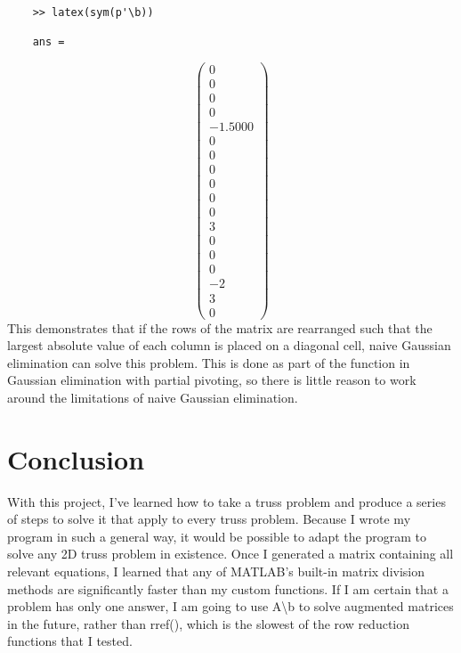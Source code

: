 \documentclass[9pt,letterpaper]{article}
\begin{document}
	\begin{verbatim}
	>> latex(sym(p'\b))
	
	ans =
	\end{verbatim}
	\[\left(\begin{array}{c} 0\\ 0\\ 0\\ 0\\ -1.5000\\ 0\\ 0\\ 0\\ 0\\ 0\\ 0\\ 3\\ 0\\ 0\\ 0\\ -2\\ 3\\ 0 \end{array}\right) \]
	This demonstrates that if the rows of the matrix are rearranged such that the largest absolute value of each column is placed on a diagonal cell, naive Gaussian elimination can solve this problem. This is done as part of the function in Gaussian elimination with partial pivoting, so there is little reason to work around the limitations of naive Gaussian elimination.
	\section{Conclusion}
	
	With this project, I've learned how to take a truss problem and produce a series of steps to solve it that apply to every truss problem. Because I wrote my program in such a general way, it would be possible to adapt the program to solve any 2D truss problem in existence. Once I generated a matrix containing all relevant equations, I learned that any of MATLAB's built-in matrix division methods are significantly faster than my custom functions. If I am certain that a problem has only one answer, I am going to use A\textbackslash b to solve augmented matrices in the future, rather than rref(), which is the slowest of the row reduction functions that I tested.
	
	
\end{document}

